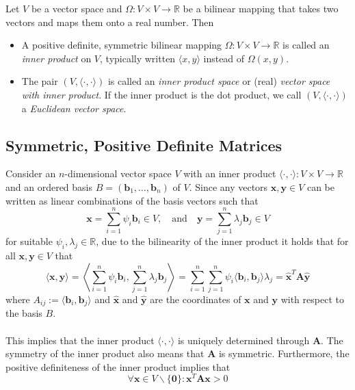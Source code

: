 \documentclass{report}
\begin{document}
Let $V$ be a vector space and $\Omega:V\times V\to\mathbb{R}$ be a bilinear mapping that takes two vectors
and maps them onto a real number. Then
\begin{itemize}
\item A positive definite, symmetric bilinear mapping $\Omega:V\times V\to\mathbb{R}$ is called an
\textit{inner product} on $V$, typically written
$\langle x,y\rangle$ instead of $\Omega(x,y)$.
\item The pair $(V,\langle\cdot,\cdot\rangle)$ is called an \textit{inner product space} or 
(real) \textit{vector space with inner product}. If the inner product is the dot product, we call 
$(V,\langle\cdot,\cdot\rangle)$ a \textit{Euclidean vector space}.
\end{itemize}
\newpage

\subsection{Symmetric, Positive Definite Matrices} %
Consider an $n$-dimensional vector space $V$ with an inner product $\langle\cdot,\cdot\rangle:V\times V\to
\mathbb{R}$ and an ordered basis $B=(\bm{b}_1,\ldots,\bm{b}_n)$ of $V$. 
Since any vectors $\bm{x},\bm{y}\in V$ can be written as linear combinations of the basis vectors
such that 
\begin{equation*}
\bm{x}=\sum^n_{i=1}\psi_i\bm{b}_i\in V,\quad\text{and}\quad\bm{y}
=\sum^n_{j=1}\lambda_j\bm{b}_j\in V
\end{equation*}
for suitable $\psi_i,\lambda_j\in\mathbb{R}$, due to the bilinearity of the inner product it holds that for 
all $\bm{x},\bm{y}\in V$ that
\begin{equation*}
\langle\bm{x},\bm{y}\rangle=\left\langle\sum^n_{i=1}\psi_i\bm{b}_i,\sum^n_{j=1}\lambda_j\bm{b}_j\right\rangle
=\sum^n_{i=1}\sum^n_{j=1}\psi_i\langle\bm{b}_i,\bm{b}_j\rangle\lambda_j
=\hat{\bm{x}}^T\bm{A}\hat{\bm{y}}
\end{equation*}
where $A_{ij}:=\langle\bm{b}_i,\bm{b}_j\rangle$ and $\hat{\bm{x}}$ and $\hat{\bm{y}}$ are the coordinates
of $\bm{x}$ and $\bm{y}$ with respect to the basis $B$.\\
\vspace{1mm}\\
This implies that the inner product $\langle\cdot,\cdot\rangle$ is uniquely determined through $\bm{A}$. 
The symmetry of the inner product also means that $\bm{A}$ is symmetric. Furthermore, the 
positive definiteness of the inner product implies that
\begin{equation*}
\forall\bm{x}\in V\backslash\{\bm{0}\}:\bm{x}^T\bm{Ax}>0
\end{equation*}
\end{document}
